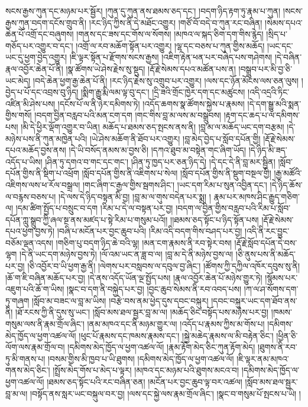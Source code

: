 སངས་རྒྱས་ཀུན་དང་མཉམ་པར་སྦྱོར། །ཀུན་དུ་ཀུན་ནས་ཐམས་ཅད་དང་། །བདག་ཉིད་རྟག་ཏུ་རྣམ་པ་ཀུན། །སངས་རྒྱས་ཀུན་བདག་དངོས་གྲུབ་ནི། །རང་ཉིད་ཀྱིས་ནི་དེ་མཐོང་འགྱུར། །གཙོ་བོ་བདེ་བ་ཀུན་རང་བཞིན། །སེམས་དཔའ་ཆེན་པོ་འགྲོ་དང་བཞུགས། །གནས་དང་ཟས་དང་གོས་ལ་སོགས། །མཁའ་ལ་སྐད་ཅིག་དག་གིས་རྙེད། །སྲིད་པ་གཅོད་པར་འགྱུར་བ་དང་། །འགྲོ་ལ་རབ་མཆོག་སྟོན་པར་འགྱུར། །ལྷ་དང་བཅས་པ་ཀུན་གྱིས་མཆོད། །ཡང་དང་ཡང་དུ་ཕྱག་བྱེད་འགྱུར། །ཇི་ལྟར་སྟོན་པ་རྫོགས་སངས་རྒྱས། །འཇིག་རྟེན་ཕན་པར་བཞེད་པས་གཤེགས། །དེ་བཞིན་རྣལ་འབྱོར་ཆེན་པོ་ནི། །སྣ་ཚོགས་ཡེ་ཤེས་རྗེས་སུ་སྡུད། །རྡོ་རྗེ་སེམས་དཔའ་མཚོན་པས་ན། །བསྒྲུབ་པར་མི་བྱ་ཅི་ཡང་མེད། །བདེ་ཆེན་ཕྱག་རྒྱ་ཆེན་པོ་ནི། །རང་ཉིད་རྗེས་སུ་འགྲུབ་པར་འགྱུར། །ལས་དང་ཉོན་མོངས་ལས་ཅན་ལུས། །བྱེད་པ་པོ་དང་འབྲས་བུ་ཉིད། །སྨིག་རྒྱུ་རྨི་ལམ་ལྟ་བུ་དང་། །དྲི་ཟའི་གྲོང་ཁྱེར་དག་དང་མཚུངས། །འདི་འདྲའི་ཏིང་འཛིན་མི་ཤེས་པས། །དངོས་པོ་ལ་ནི་ཉེར་དམིགས་ཏེ། །འདོད་ཆགས་སྣ་ཚོགས་སྐྱེས་པ་རྣམས། །དེ་དག་སྒྱུ་མའི་སྨན་གྱིས་གསོ། །བདག་བྱིན་བརླབ་པའི་མན་ངག་དག །གང་གིས་བླ་མ་ལས་མ་བསྒྲུབས། །རྟག་དང་ཆད་པ་ལ་དམིགས་པས། །མི་དེ་ཕྱིར་ལྡོག་འགྱུར་བ་ཡིན། མཆོད་པ་ཐམས་ཅད་སྤངས་ནས་ནི། །བླ་མ་ལ་མཆོད་ཡང་དག་བརྩམ། །དེ་མཉེས་པས་ནི་ཀུན་མཁྱེན་པའི། །ཡེ་ཤེས་མཆོག་ནི་ཐོབ་པར་འགྱུར། །བླ་མེད་བྱེད་པ་སློབ་དཔོན་གྱི། །རྡོ་རྗེ་སེམས་དཔའ་མཆོད་བྱས་ནས། །དེ་ཡི་བསོད་ནམས་མ་བྱས་ཅི། །དཀའ་ཐུབ་མ་བསྟེན་གང་ཞིག་ཡོད། །དེ་ཉིད་མི་ཟད་འདོད་པ་ཡིས། །ཤིན་ཏུ་དགའ་བ་གང་དང་གང་། །ཤིན་ཏུ་ཁྱད་པར་ཅན་ཉིད་དེ། །དེ་དང་དེ་ནི་བླ་མར་སྦྱིན། །སློབ་དཔོན་གྱིས་ནི་སྡིག་པ་འཕྲོག །སློབ་དཔོན་གྱིས་ནི་འཇིགས་པ་སེལ། །སློབ་དཔོན་གྱིས་ནི་སྡུག་བསྔལ་གྱི། །རྒྱ་མཚོའི་འཇིགས་ལས་ཕ་རོལ་བསྒྲལ། །གང་ཞིག་ང་རྒྱལ་གྱིས་སྦགས་ཤིང་། །ཡང་དག་རིམ་པ་སུན་འབྱིན་དང་། །དེ་ཉིད་ཆོས་ལ་བརྙས་བཅས་པ། །དེ་ལས་དེ་ཉིད་བསྟན་མི་བྱ། །བླ་མ་ལ་གུས་བདེན་པར་སྨྲ། །
རྣམ་པར་མཁས་ཤིང་རྒྱུད་གཅིག་ལ། །དམ་ཚིག་སྤྱོད་པ་བསྲུང་བ་དག །རིམ་པ་དེ་ལ་བསྟན་པར་བྱ། །བདག་ལ་བྱིན་གྱིས་བརླབ་པའི་རིམ་པ་སློབ་དཔོན་ཀླུ་སྒྲུབ་ཀྱི་ཞལ་སྔ་ནས་མཛད་པ་སྟེ་རིམ་པ་གསུམ་པའོ།། །།ཐམས་ཅད་སྟོང་པ་ཉིད་སྟོན་པས། །རྡོ་རྗེ་སེམས་དཔའ་ཕྱག་བྱས་ཏེ། །བཞི་པ་མངོན་པར་བྱང་ཆུབ་པའི། །རིམ་འདི་བདག་གིས་བཤད་པར་བྱ། །འདི་ནི་རང་བྱུང་བཅོམ་ལྡན་འདས། །གཅིག་པུ་བདག་ཉིད་ཆེ་བའི་ལྷ། །མན་ངག་རྣམས་ནི་རབ་སྟེར་བས། །རྡོ་རྗེ་སློབ་དཔོན་དེ་བས་ལྷག །དེ་ནི་ཡང་དག་མཉེས་བྱས་ཏེ། །ལོ་འམ་ཡང་ན་ཟླ་བ་ལ། །བླ་མ་དེ་ནི་མཉེས་བྱས་ལ། །ཅི་ནུས་པས་ནི་མཆོད་པར་བྱ། །ཅི་འབྱོར་བ་ཡི་ཕྱག་རྒྱ་ནི། །ལེགས་པར་བསླབས་ལ་དབུལ་བྱ་ཞིང་། །ཚོགས་ཀྱི་དཀྱིལ་འཁོར་དབུས་སུ་ནི། །ཆོ་ག་ཇི་བཞིན་མཆོད་པར་བྱ། །དེ་ནས་འདོད་ཡོན་ལྔ་སྤྱོད་པས། །རྣལ་འབྱོར་ཆེན་པོ་མཉེས་གྱུར་ཏེ། །སྙོམས་པར་འཇུག་པའི་ཆོ་ག་ཡིས། །སྣང་བ་དག་ནི་བསྐྱེད་པར་བྱ། །བྱང་ཆུབ་སེམས་ནི་རབ་འབད་པས། །ཀ་ལ་ཤ་སོགས་དག་ཏུ་གཞག །སློབ་མ་བཟང་ལ་བླ་མ་ཡིས། །བརྩེ་བས་ནམ་ཕྱེད་དུས་དབང་བསྐུར། །དབང་བསྐུར་ཡང་དག་ཐོབ་ནས་ནི། །ཐོ་རངས་ཀྱི་ནི་དུས་སུ་ཡང་། །སློབ་མས་ཐལ་སྦྱར་བླ་མ་ལ། །མཆོད་ཅིང་བསྟོད་པས་མཉེས་པར་བྱ། །ཁམས་གསུམ་ལས་ནི་རྣམ་གྲོལ་ཞིང་། །ནམ་མཁའ་དང་ནི་མཉམ་གྱུར་ལ། །འདོད་པ་རྣམས་ཀྱིས་མ་གོས་པ། །དམིགས་མེད་ཁྱོད་ལ་ཕྱག་འཚལ་ལོ། །ཕུང་པོ་རྣམས་དང་ཁམས་རྣམས་དང་། །སྐྱེ་མཆེད་རྣམས་ལ་མི་བརྟེན་ཅིང་། །ཕྱིན་ཅི་ལོག་ལས་རྣམ་གྲོལ་བ། །དམིགས་མེད་ཁྱོད་ལ་ཕྱག་འཚལ་ལོ། །རྣམ་རྟོག་མེད་ཅིང་ཀུན་རྟོག་མེད། །ཐུགས་ནི་རབ་ཏུ་མི་གནས་པ། །བསམ་གྱིས་མི་ཁྱབ་པ་ཡི་ཐུགས། །དམིགས་མེད་ཁྱོད་ལ་ཕྱག་འཚལ་ལོ། །ཇི་ལྟར་ནམ་མཁའ་གནས་མེད་ཅིང་། །སྤྲོས་མེད་གོས་པ་མེད་པ་ལྟར། །མཁའ་དང་མཉམ་པའི་ཐུགས་མངའ་བ། །དམིགས་མེད་ཁྱོད་ལ་ཕྱག་འཚལ་ལོ། །ཐམས་ཅད་སྟོང་པའི་རང་བཞིན་ཅན། །མངོན་པར་བྱང་ཆུབ་ལྟ་བར་འཚལ། །སློབ་མས་ཐལ་སྦྱར་བླ་མ་ལ། །བསྟོད་ནས་སླར་ཡང་བསྐུལ་བར་བྱ། །ལས་དང་སྐྱེ་ལས་རྣམ་གྲོལ་ཞིང་། །སྣང་བ་གསུམ་པོ་སྤངས་པ་ཡི། །
